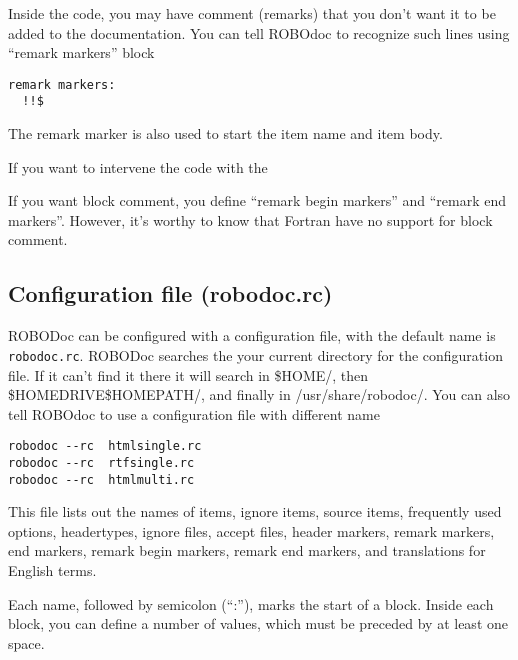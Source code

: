 Inside the code, you may have comment (remarks) that you don't want it
to be added to the documentation. You can tell ROBOdoc to recognize
such lines using ``remark markers'' block
\begin{verbatim}
remark markers:
  !!$
\end{verbatim}
The remark marker is also used to start the item name and item body. 


If you want to intervene the code with the 

If you want block comment, you define ``remark begin markers'' and
``remark end markers''. However, it's worthy to know that Fortran have
no support for block comment. 

\subsection{Configuration file (robodoc.rc)}
\label{sec:conf-file-robod}

ROBODoc can be configured with a configuration file, with the default
name is \verb!robodoc.rc!. ROBODoc searches the your current directory
for the configuration file. If it can't find it there it will search
in \$HOME/, then \$HOMEDRIVE\$HOMEPATH/, and finally in
/usr/share/robodoc/.  You can also tell ROBOdoc to use a configuration
file with different name
\begin{verbatim}
robodoc --rc  htmlsingle.rc
robodoc --rc  rtfsingle.rc
robodoc --rc  htmlmulti.rc
\end{verbatim}

\begin{framed}
  This file lists out the names of items, ignore items, source items,
  frequently used options, headertypes, ignore files, accept files,
  header markers, remark markers, end markers, remark begin markers,
  remark end markers, and translations for English terms.

  Each name, followed by semicolon (``:''), marks the start of a
  block. Inside each block, you can define a number of values, which
  must be preceded by at least one space. 

\end{framed}

